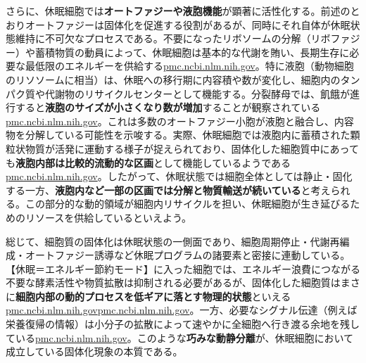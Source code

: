 さらに、休眠細胞では\textbf{オートファジーや液胞機能}が顕著に活性化する。前述のとおりオートファジーは固体化を促進する役割があるが、同時にそれ自体が休眠状態維持に不可欠なプロセスである。不要になったリボソームの分解（リボファジー）や蓄積物質の動員によって、休眠細胞は基本的な代謝を賄い、長期生存に必要な最低限のエネルギーを供給する\href{https://pmc.ncbi.nlm.nih.gov/articles/PMC6857596/\#:~:text=this\%20state,mediate\%20the\%20CF\%20state\%20in}{pmc.ncbi.nlm.nih.gov}。特に液胞（動物細胞のリソソームに相当）は、休眠への移行期に内容積や数が変化し、細胞内のタンパク質や代謝物のリサイクルセンターとして機能する。分裂酵母では、飢餓が進行すると\textbf{液胞のサイズが小さくなり数が増加}することが観察されている\href{https://pmc.ncbi.nlm.nih.gov/articles/PMC6857596/\#:~:text=match\%20at\%20L559\%20ER\%20and,tagged}{pmc.ncbi.nlm.nih.gov}。これは多数のオートファジー小胞が液胞と融合し、内容物を分解している可能性を示唆する。実際、休眠細胞では液胞内に蓄積された顆粒状物質が活発に運動する様子が捉えられており、固体化した細胞質中にあっても\textbf{液胞内部は比較的流動的な区画}として機能しているようである\href{https://pmc.ncbi.nlm.nih.gov/articles/PMC6857596/\#:~:text=exception\%20were\%20small\%20particles\%20that,2\%20days\%20in\%20culture\%20as}{pmc.ncbi.nlm.nih.gov}。したがって、休眠状態では細胞全体としては静止・固化する一方、\textbf{液胞内など一部の区画では分解と物質輸送が続いている}と考えられる。この部分的な動的領域が細胞内リサイクルを担い、休眠細胞が生き延びるためのリソースを供給しているといえよう。

総じて、細胞質の固体化は休眠状態の一側面であり、細胞周期停止・代謝再編成・オートファジー誘導など休眠プログラムの諸要素と密接に連動している。【休眠＝エネルギー節約モード】に入った細胞では、エネルギー浪費につながる不要な酵素活性や物質拡散は抑制される必要があるが、固体化した細胞質はまさに\textbf{細胞内部の動的プロセスを低ギアに落とす物理的状態}といえる\href{https://pmc.ncbi.nlm.nih.gov/articles/PMC4850707/\#:~:text=it\%20to\%20be\%20associated\%20with,fluid\%20that\%20can\%20reversibly\%20transition}{pmc.ncbi.nlm.nih.gov}\href{https://pmc.ncbi.nlm.nih.gov/articles/PMC4850707/\#:~:text=cytoplasm\%20to\%20a\%20solid,like\%20state}{pmc.ncbi.nlm.nih.gov}。一方、必要なシグナル伝達（例えば栄養復帰の情報）は小分子の拡散によって速やかに全細胞へ行き渡る余地を残している\href{https://pmc.ncbi.nlm.nih.gov/articles/PMC11214080/\#:~:text=spores\%20and\%20uncovered\%20signaling\%20pathways,such\%20as\%20ribosomes\%2C\%20is\%20restricted}{pmc.ncbi.nlm.nih.gov}。このような\textbf{巧みな動静分離}が、休眠細胞において成立している固体化現象の本質である。

